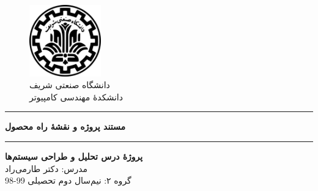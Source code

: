\begin{center}
	\null
	\vspace{1cm}
\begin{figure}[H]
	\centering
	\includegraphics[width=0.275\textwidth]{sharif-logo-fa.png}
	\caption*{دانشگاه صنعتی شریف\\
		\large{
	دانشکدهٔ مهندسی کامپیوتر}
}
\end{figure}
\vspace{1 cm}
\hrule
\vspace{.5cm}
\fontsize{28}{28}\textbf{
مستند پروژه و
نقشهٔ راه محصول
}
\\
\vspace{.5cm}
\hrule
\vspace{1cm}
\fontsize{16}{16}\textbf{
پروژهٔ درس تحلیل و طراحی سیستم‌ها\\
}
\vspace{1.5cm}
\normalfont
\large{
مدرس:
دکتر طارمی‌راد\\}
\vspace{2 cm}
\fontsize{13}{13}
گروه ۲:
\fontsize{14}{14}{\selectfont
	\makecell{\teamMemOne\\ \stdIdOne}
	\makecell{\teamMemTwo\\ \stdIdTwo}
	\makecell{\teamMemThree\\ \stdIdThree}
	\makecell{\teamMemFour\\ \stdIdFour}
}
\normalsize
\vfill{نیم‌سال دوم تحصیلی 99-98}
\end{center}
\thispagestyle{empty}